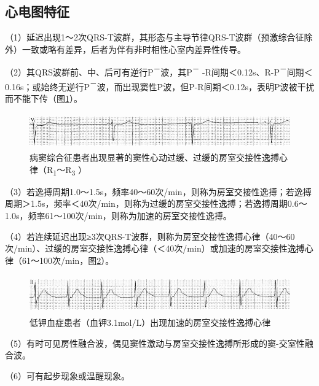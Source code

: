 \protect\hypertarget{text00019.htmlux5cux23subid182}{}{}

\subsection{心电图特征}

（1）延迟出现1～2次QRS-T波群，其形态与主导节律QRS-T波群（预激综合征除外）一致或略有差异，后者为伴有非时相性心室内差异性传导。

（2）其QRS波群前、中、后可有逆行P\textsuperscript{－}波，其P\textsuperscript{－} -R间期＜0.12s、R-P\textsuperscript{－}间期＜0.16s；或始终无逆行P\textsuperscript{－}波，而出现窦性P波，但P-R间期＜0.12s，表明P波被干扰而不能下传（图\ref{fig12-5}）。

\begin{figure}[!htbp]
 \centering
 \includegraphics[width=5.58333in,height=0.60417in]{./images/Image00198.jpg}
 \captionsetup{justification=centering}
 \caption{病窦综合征患者出现显著的窦性心动过缓、过缓的房室交接性逸搏心律（R\textsubscript{1}～R\textsubscript{3} ）}
 \label{fig12-5}
  \end{figure} 


（3）若逸搏周期1.0～1.5s，频率40～60次/min，则称为房室交接性逸搏；若逸搏周期＞1.5s，频率＜40次/min，则称为过缓的房室交接性逸搏；若逸搏周期0.6～1.0s，频率61～100次/min，则称为加速的房室交接性逸搏。

（4）若连续延迟出现≥3次QRS-T波群，则称为房室交接性逸搏心律（40～60次/min）、过缓的房室交接性逸搏心律（＜40次/min）或加速的房室交接性逸搏心律（61～100次/min，图\ref{fig12-6}）。

\begin{figure}[!htbp]
 \centering
 \includegraphics[width=5.58333in,height=0.65625in]{./images/Image00199.jpg}
 \captionsetup{justification=centering}
 \caption{低钾血症患者（血钾3.1mol/L）出现加速的房室交接性逸搏心律}
 \label{fig12-6}
  \end{figure} 

（5）有时可见房性融合波，偶见窦性激动与房室交接性逸搏所形成的窦-交室性融合波。

（6）可有起步现象或温醒现象。

